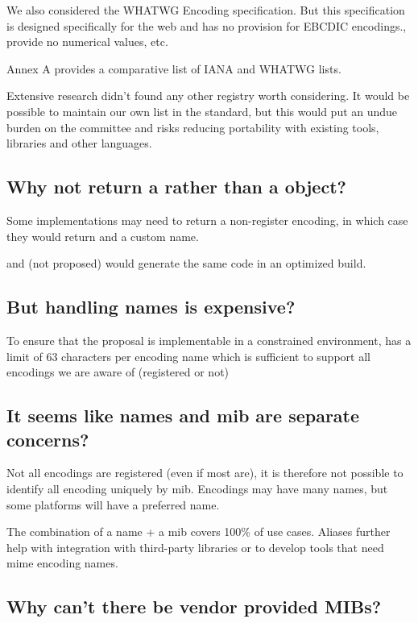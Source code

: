 \documentclass{wg21}
\begin{document}
We also considered the WHATWG Encoding specification. But this specification is designed specifically for the web
and has no provision for EBCDIC encodings., provide no numerical values, etc.

Annex A provides a comparative list of IANA and WHATWG lists.

Extensive research didn't found any other registry worth considering.
It would be possible to maintain our own list in the standard, but this would put an undue burden on the committee and
risks reducing portability with existing tools, libraries and other languages.

\subsection{Why not return a  rather than a  object?}
Some implementations may need to return a non-register encoding, in which case they would return  and a custom name.

 and  (not proposed) would generate the same code in an optimized build.


\subsection{But handling names is expensive?}
To ensure that the proposal is implementable in a constrained environment,  has a limit of 63 characters per encoding name
which is sufficient to support all encodings we are aware of (registered or not)

\subsection{It seems like names and mib are separate concerns?}

Not all encodings are registered (even if most are), it is therefore not possible to identify all encoding uniquely by mib.
Encodings may have many names, but some platforms will have a preferred name.

The combination of a name + a mib covers 100\% of use cases. Aliases further help with integration with third-party libraries or to develop
tools that need mime encoding names.

\subsection{Why can't there be vendor provided MIBs?}
\end{document}
